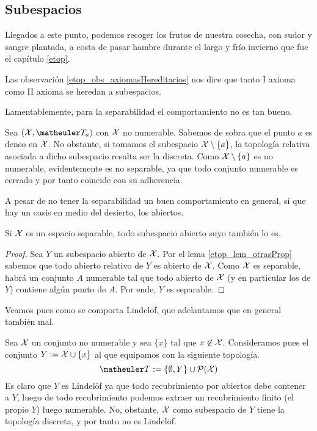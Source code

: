 \subsection{Subespacios}
Llegados a este punto, podemos recoger los frutos de nuestra cosecha, con sudor y sangre plantada, a costa de pasar hambre durante el largo y frío invierno que fue el capítulo \ref{etop}.
\begin{obs}
	Las observación \ref{etop_obs_axiomasHereditarios} nos dice que tanto I axioma como II axioma se heredan a subespacios.
\end{obs}
Lamentablemente, para la separabilidad el comportamiento no es tan bueno.
\begin{exa}
	Sea $(\X,\T_a)$ con $\mathcal{X}$ no numerable. Sabemos de sobra que el punto $a$ es denso en $\mathcal{X}$. No obstante, si tomamos el subespacio $\mathcal{X}\setminus\{a\}$, la topología relativa asociada a dicho subespacio resulta ser la discreta. Como $\mathcal{X}\setminus\{a\}$ es no numerable, evidentemente es no separable, ya que todo conjunto numerable es cerrado y por tanto coincide con su adherencia.
\end{exa}
A pesar de no tener la separabilidad un buen comportamiento en general, si que hay un oasis en medio del desierto, los abiertos.
\begin{lem}
	Si $\mathcal{X}$ es un espacio separable, todo subespacio abierto suyo también lo es.
\end{lem}
\begin{proof}
	Sea $Y$ un subespacio abierto de $\mathcal{X}$. Por el lema \ref{etop_lem_otrasProp} sabemos que todo abierto relativo de $Y$ es abierto de $\mathcal{X}$. Como $\mathcal{X}$ es separable, habrá un conjunto $A$ numerable tal que todo abierto de $\mathcal{X}$ (y en particular los de $Y$) contiene algún punto de $A$. Por ende, $Y$ es separable. 
\end{proof}
Veamos pues como se comporta Lindelöf, que adelantamos que en general también mal.
\begin{exa}
	Sea $\mathcal{X}$ un conjunto no numerable y sea $\{x\}$ tal que $x\not\in\mathcal{X}$. Consideramos pues el conjunto $Y:=\mathcal{X}\cup\{x\}$ al que equipamos con la siguiente topología.
	\begin{equation*}
		\T:=\{\emptyset, Y\}\cup\partes(\X)
	\end{equation*}
	Es claro que $Y$ es Lindelöf ya que todo recubrimiento por abiertos debe contener a $Y$, luego de todo recubrimiento podemos extraer un recubrimiento finito (el propio $Y$) luego numerable. No, obstante, $\mathcal{X}$ como subespacio de $Y$ tiene la topología discreta, y por tanto no es Lindelöf.
\end{exa}
